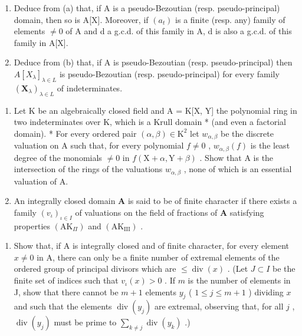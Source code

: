 \begin{enumerate}
\def\labelenumi{(\alph{enumi})}
\setcounter{enumi}{1}
\item
  Deduce from (a) that, if A is a pseudo-Bezoutian (resp. pseudo-principal) domain, then so is A{[}X{]}. Moreover, if \((a_{t})\) is a finite (resp. any) family of elements \(\neq0\) of A and d a g.c.d. of this family in A, d is also a g.c.d. of this family in A{[}X{]}.
\item
  Deduce from (b) that, if A is pseudo-Bezoutian (resp. pseudo-principal) then \(A[X_{\lambda}]_{\lambda \in L}\) is pseudo-Bezoutian (resp. pseudo-principal) for every family \((\mathbf{X}_{\lambda})_{\lambda \in L}\) of indeterminates.
\end{enumerate}

\begin{enumerate}
\def\labelenumi{\arabic{enumi}.}
\setcounter{enumi}{23}
\item
  Let K be an algebraically closed field and A = K{[}X, Y{]} the polynomial ring in two indeterminates over K, which is a Krull domain * (and even a factorial domain). * For every ordered pair \((\alpha, \beta) \in \mathrm{K}^{2}\) let \(w_{\alpha,\beta}\) be the discrete valuation on A such that, for every polynomial \(f \neq 0\) , \(w_{\alpha,\beta}(f)\) is the least degree of the monomials \(\neq 0\) in \(f(\mathrm{X} + \alpha, \mathrm{Y} + \beta)\) . Show that A is the intersection of the rings of the valuations \(w_{\alpha,\beta}\) , none of which is an essential valuation of A.
\item
  An integrally closed domain \(\mathbf{A}\) is said to be of finite character if there exists a family \((v_{\iota})_{\iota \in I}\) of valuations on the field of fractions of \(\mathbf{A}\) satisfying properties \((\mathrm{AK}_{\Pi})\) and \((\mathrm{AK}_{\mathrm{III}})\) .
\end{enumerate}

\begin{enumerate}
\def\labelenumi{(\alph{enumi})}
\tightlist
\item
  Show that, if A is integrally closed and of finite character, for every element \(x \neq 0\) in A, there can only be a finite number of extremal elements of the ordered group of principal divisors which are \(\leqslant \operatorname{div}(x)\) . (Let \(J \subset I\) be the finite set of indices such that \(v_{\iota}(x) > 0\) . If \(m\) is the number of elements in J, show that there cannot be \(m + 1\) elements \(y_{j}\) ( \(1 \leqslant j \leqslant m + 1\) ) dividing \(x\) and such that the elements \(\operatorname{div}(y_{j})\) are extremal, observing that, for all \(j\) , \(\operatorname{div}(y_{j})\) must be prime to \(\sum_{k \neq j} \operatorname{div}(y_{k})\) .)
\end{enumerate}

